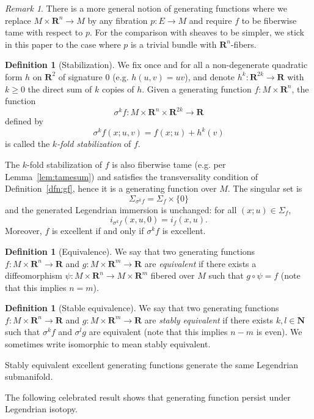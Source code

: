 \documentclass[12pt,a4paper]{article}
\numberwithin{equation}{section}
\theoremstyle{definition}
\newtheorem{dfn}[equation]{Definition}
\theoremstyle{remark}
\newtheorem{rem}[equation]{Remark}
\newcommand{\R}{\mathbf{R}}
\newcommand{\N}{\mathbf{N}}
\begin{document}
\begin{rem}
There is a more general notion of generating functions where we replace $M\times \R^n\to M$ by any fibration $p:E\to M$
and require $f$ to be fiberwise tame with respect to $p$. For the comparison with sheaves to be simpler, we stick in this paper
to the case where $p$ is a trivial bundle with $\R^n$-fibers.
\end{rem}


\begin{dfn}[Stabilization]
We fix once and for all a non-degenerate quadratic form $h$ on $\R^2$ of signature $0$ (e.g. $h(u,v)=uv$), and denote $h^k:\R^{2k}\to \R$ with $k \geq 0$
the direct sum of $k$ copies of $h$. Given a generating function $f:M\times \R^n$, the function
\[\sigma^k f : M\times \R^n\times \R^{2k} \to \R\]
defined by
\[\sigma^k f(x;u,v)=f(x;u)+h^k(v)\]
is called the \emph{$k$-fold stabilization} of $f$.
\end{dfn}

The $k$-fold stabilization of $f$ is also fiberwise tame (e.g. per Lemma~\ref{lem:tamesum}) and satisfies the transversality condition of Definition~\ref{dfn:gf},
hence it is a generating function over $M$. The singular set is
\[\Sigma_{\sigma^k f}= \Sigma_f \times \{0\}\]
and the generated Legendrian immersion is unchanged: for all $(x;u)\in \Sigma_f$,
\[i_{\sigma^k f}(x,u,0)=i_f(x,u).\]
Moreover, $f$ is excellent if and only if $\sigma^k f$ is excellent.

\begin{dfn}[Equivalence]
We say that two generating functions $f:M\times \R^n\to \R$ and $g:M\times \R^m\to \R$
are \emph{equivalent} if there exists a diffeomorphism $\psi : M\times \R^n\to M\times \R^m$
fibered over $M$ such that $g\circ \psi=f$ (note that this implies $n=m$).
\end{dfn}

\begin{dfn}[Stable equivalence]
We say that two generating functions $f:M\times \R^n\to \R$ and $g:M\times \R^m \to \R$ are \emph{stably equivalent} if there exists $k,l\in \N$ such that $\sigma^k f$
and $\sigma^l g$ are equivalent (note that this implies $n-m$ is even).
We sometimes write isomorphic to mean stably equivalent.
\end{dfn}

Stably equivalent excellent generating functions generate the same Legendrian submanifold.

The following celebrated result shows that generating function persist under Legendrian isotopy.
\end{document}
